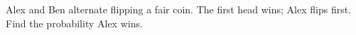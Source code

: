 Alex and Ben alternate flipping a fair coin. The first head wins; Alex flips first. Find the probability Alex wins.
